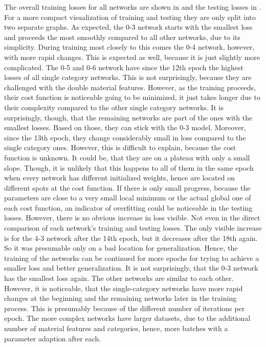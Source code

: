 The overall training losses for all networks are shown in  and the testing losses in .
For a more compact visualization of training and testing they are only split into two separate graphs.
As expected, the 0-3 network starts with the smallest loss and proceeds the most smoothly compared to all other networks, due to its simplicity.
During training most closely to this comes the 0-4 network, however, with more rapid changes.
This is expected as well, because it is just slightly more complicated.
The 0-5 and 0-6 network have since the 12th epoch the highest losses of all single category networks.
This is not surprisingly, because they are challenged with the double material features.
However, as the training proceeds, their cost function is noticeable going to be minimized, it just takes longer due to their complexity compared to the other single category networks.
It is surprisingly, though, that the remaining networks are part of the ones with the smallest losses.
Based on those, they can stick with the 0-3 model.
Moreover, since the 13th epoch, they change considerably small in loss compared to the single category ones.
However, this is difficult to explain, because the cost function is unknown.
It could be, that they are on a plateau with only a small slope.
Though, it is unlikely that this happens to all of them in the same epoch when every network has different initialized weights, hence are located on different spots at the cost function.
If there is only small progress, because the parameters are close to a very small local minimum or the actual global one of each cost function, an indicator of overfitting could be noticeable in the testing losses.
However, there is no obvious increase in loss visible.
Not even in the direct comparison of each network's training and testing losses.
The only visible increase is for the 4-3 network after the 14th epoch, but it decreases after the 18th again.
So it was presumable only on a bad location for generalization.
Hence, the training of the networks can be continued for more epochs for trying to achieve a smaller loss and better generalization.
It is not surprisingly, that the 0-3 network has the smallest loss again.
The other networks are similar to each other.
However, it is noticeable, that the single-category networks have more rapid changes at the beginning and the remaining networks later in the training process.
This is presumably because of the different number of iterations per epoch.
The more complex networks have larger datasets, due to the additional number of material features and categories, hence, more batches with a parameter adaption after each.
